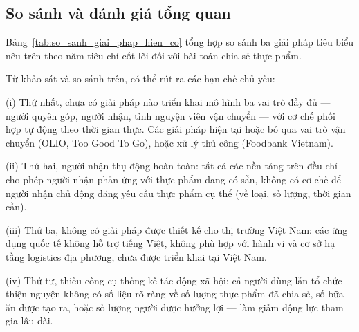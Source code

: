 \documentclass[../main.tex]{subfiles}%
\begin{document}
\subsection{So sánh và đánh giá tổng quan}
\label{subsection:1.2.2}

Bảng~\ref{tab:so_sanh_giai_phap_hien_co} tổng hợp so sánh ba giải pháp tiêu biểu nêu trên theo năm tiêu chí cốt lõi đối với bài toán chia sẻ thực phẩm.

\begin{table}[H]
\centering
{}
\caption{So sánh các giải pháp hiện có}
\label{tab:so_sanh_giai_phap_hien_co}
\end{table}

Từ khảo sát và so sánh trên, có thể rút ra các hạn chế chủ yếu:

(i) Thứ nhất, chưa có giải pháp nào triển khai mô hình ba vai trò đầy đủ — người quyên góp, người nhận, tình nguyện viên vận chuyển — với cơ chế phối hợp tự động theo thời gian thực. Các giải pháp hiện tại hoặc bỏ qua vai trò vận chuyển (OLIO, Too Good To Go), hoặc xử lý thủ công (Foodbank Vietnam).

(ii) Thứ hai, người nhận thụ động hoàn toàn: tất cả các nền tảng trên đều chỉ cho phép người nhận phản ứng với thực phẩm đang có sẵn, không có cơ chế để người nhận chủ động đăng yêu cầu thực phẩm cụ thể (về loại, số lượng, thời gian cần).

(iii) Thứ ba, không có giải pháp được thiết kế cho thị trường Việt Nam: các ứng dụng quốc tế không hỗ trợ tiếng Việt, không phù hợp với hành vi và cơ sở hạ tầng logistics địa phương, chưa được triển khai tại Việt Nam.

(iv) Thứ tư, thiếu công cụ thống kê tác động xã hội: cả người dùng lẫn tổ chức thiện nguyện không có số liệu rõ ràng về số lượng thực phẩm đã chia sẻ, số bữa ăn được tạo ra, hoặc số lượng người được hưởng lợi — làm giảm động lực tham gia lâu dài.
\end{document}
